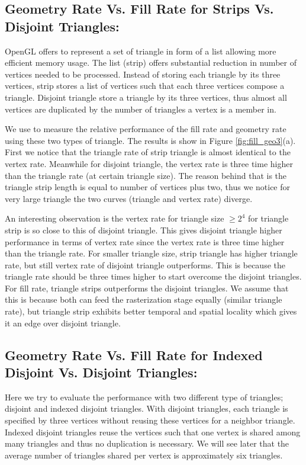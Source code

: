 \subsection{Geometry Rate Vs. Fill Rate for Strips Vs. Disjoint Triangles:}
OpenGL offers to represent a set of triangle in form of a list allowing more efficient memory usage. The list (strip) offers substantial reduction in number of vertices needed to be processed. Instead of storing each triangle by its three vertices, strip stores a list of vertices such that each three vertices compose a triangle. Disjoint triangle store a triangle by its three vertices, thus almost all vertices are duplicated by the number of triangles a vertex is a member in. 

We use \protect{\wes} to measure the relative performance of the fill rate and geometry rate using these two types of triangle. The results is show in Figure \ref{fig:fill_geo3}(a). First we notice that the triangle rate of strip triangle is almost identical to the vertex rate. Meanwhile for disjoint triangle, the vertex rate is three time higher than the triangle rate (at certain triangle size). The reason behind that is the triangle strip length is equal to number of vertices plus two, thus we notice for very large triangle the two curves (triangle and vertex rate) diverge. 

An interesting observation is the vertex rate for triangle size $\geq 2^{4}$ for triangle strip is so close to this of disjoint triangle. This gives disjoint triangle higher performance in terms of vertex rate since the vertex rate is three time higher than the triangle rate. For smaller triangle size, strip triangle has higher triangle rate, but still vertex rate of disjoint triangle outperforms. This is because the triangle rate should be three times higher to start overcome the disjoint triangles. For fill rate, triangle strips outperforms the disjoint triangles. We assume that this is because both can feed the rasterization stage equally (similar triangle rate), but triangle strip exhibits better temporal and spatial locality which gives it an edge over disjoint triangle. 


\subsection{Geometry Rate Vs. Fill Rate for Indexed Disjoint Vs. Disjoint Triangles:}
Here we try to evaluate the performance with two different type of triangles; disjoint and indexed disjoint triangles. With disjoint triangles, each triangle is specified by three vertices without reusing these vertices for a neighbor triangle. Indexed disjoint triangles reuse the vertices such that one vertex is shared among many triangles and thus no duplication is necessary. We will see later that the average number of triangles shared per vertex is approximately six triangles. 

